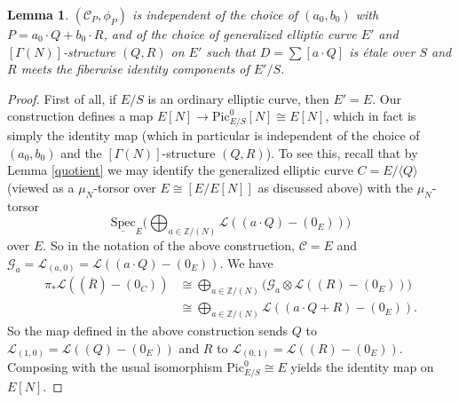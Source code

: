 \documentclass[11pt]{amsart}
\newtheorem{lemma}[subsection]{Lemma}
\theoremstyle{definition}
\begin{document}
\begin{lemma}
$({\mathcal{C}}_P,\phi_P)$ is independent of the choice of $(a_0,b_0)$ with $P = a_0\cdot Q + b_0 \cdot R$, and of the choice of generalized elliptic curve $E'$ and $[\Gamma(N)]$-structure $(Q,R)$ on $E'$ such that $D = \sum [a\cdot Q]$ is \'etale over $S$ and $R$ meets the fiberwise identity components of $E'/S$.
\end{lemma}
\begin{proof} 
First of all, if $E/S$ is an ordinary elliptic curve, then $E' = E$. Our construction defines a map $E[N] \rightarrow \mathrm{Pic}^0_{E/S}[N] \cong E[N]$, which in fact is simply the identity map (which in particular is independent of the choice of $(a_0,b_0)$ and the $[\Gamma(N)]$-structure $(Q,R)$). To see this, recall that by Lemma \ref{quotient} we may identify the generalized elliptic curve $C = E/\langle Q \rangle$ (viewed as a $\mu_N$-torsor over $E \cong [E/E[N]]$ as discussed above) with the $\mu_N$-torsor 
\begin{displaymath}
\underline{\mathrm{Spec}}_E \big( \bigoplus_{a \in \mathbb{Z}/(N)} {\mathcal{L}}((a\cdot Q) - (0_E)) \big) 
\end{displaymath}
over $E$. So in the notation of the above construction, ${\mathcal{C}} = E$ and ${\mathcal{G}}_a = {\mathcal{L}}_{(a,0)} = {\mathcal{L}}((a\cdot Q) - (0_E))$. We have 
\begin{align*}
\pi_*{\mathcal{L}}((\overline{R}) - (0_C)) & \cong \bigoplus_{a \in \mathbb{Z}/(N)} \big( {\mathcal{G}}_a \otimes {\mathcal{L}}((R) - (0_E)) \big) \\
&\cong \bigoplus_{a \in \mathbb{Z}/(N)} {\mathcal{L}}((a\cdot Q + R) - (0_E)).
\end{align*}
So the map defined in the above construction sends $Q$ to ${\mathcal{L}}_{(1,0)} = {\mathcal{L}}((Q) - (0_E))$ and $R$ to ${\mathcal{L}}_{(0,1)} = {\mathcal{L}}((R) - (0_E))$. Composing with the usual isomorphism $\mathrm{Pic}^0_{E/S} \cong E$ yields the identity map on $E[N]$.


\end{proof}
\end{document}
